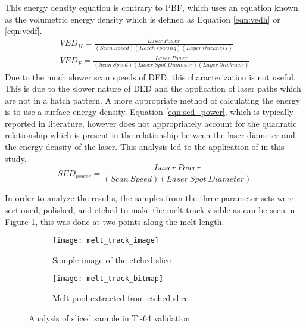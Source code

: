 This energy density equation is contrary to \ac{PBF}, which uses an equation known as the volumetric energy density which is defined as Equation \ref{eqn:vedh} or \ref{eqn:vedf}.
\begin{align}
	VED_H = \frac{Laser\ Power}{(Scan\ Speed)  (Hatch\ spacing)  (Layer\ thickness)} \label{eqn:vedh}\\
	VED_F = \frac{Laser\ Power}{(Scan\ Speed) (Laser\ Spot\ Diameter) (Layer\ thickness)} \label{eqn:vedf}
\end{align}
Due to the much slower scan speeds of \ac{DED}, this characterization is not useful.  This is due to the slower nature of \ac{DED} and the application of laser paths which are not in a hatch pattern.  A more appropriate method of calculating the energy is to use a surface energy density,  
Equation \ref{eqn:sed_power}, which is typically reported in literature, however does not appropriately account for the quadratic relationship which is present in the relationship between the laser diameter and the energy density of the laser.  This analysis led to the application of \label{eqn:eng_density} in this study.
\begin{equation}
	SED_{power} = \frac{Laser\ Power}{(Scan\ Speed) (Laser\ Spot\ Diameter)} \label{eqn:sed_power}
\end{equation}


In order to analyze the results, the samples from the three parameter sets were sectioned, polished, and etched to make the melt track visible as can be seen in Figure \ref{fig:melt_track_image}, this was done at two points along the melt length.  
\begin{figure}[!htb]
	\centering
		\begin{subfigure}{0.495\textwidth}
		\texttt{[image: melt\_track\_image]}
		\caption{Sample image of the etched slice}
		\label{fig:melt_track_image}
		\end{subfigure}
			\begin{subfigure}{0.495\textwidth}
			\texttt{[image: melt\_track\_bitmap]}
			\caption{Melt pool extracted from etched slice}
			\label{fig:melt_track_bitmap}
			\end{subfigure}
	\caption{Analysis of sliced sample in Ti-64 validation}
	\label{fig:melt_track}
\end{figure}

